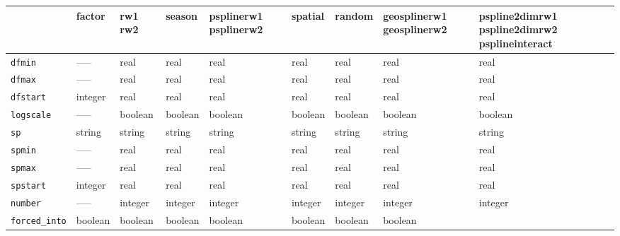 \begin{sidewaystable} \footnotesize
\begin{tabular}{|l||p{1.5cm}|p{1.5cm}|p{1.5cm}|p{1.5cm}|p{2cm}|p{1.5cm}|p{2cm}|p{2.5cm}|}

\hline
                     & factor & rw1 \newline rw2 & season & psplinerw1 \newline psplinerw2 & spatial & random & geosplinerw1 \newline geosplinerw2
                     & pspline2dimrw1 \newline pspline2dimrw2 \newline psplineinteract \\
\hline\hline
 {\tt dfmin}        & -----   & real             & real   & real                           & real    & real   & real
                    & real \\
\hline
 {\tt dfmax}        & -----   & real             & real   & real                           & real    & real   & real
                    & real \\
\hline
 {\tt dfstart}      & integer & real             & real   & real                           & real    & real   & real
                    & real \\
\hline
 {\tt logscale}     & -----   & boolean          & boolean & boolean                       & boolean & boolean & boolean
                    & boolean \\
\hline
 {\tt sp}           & string & string          & string & string                       & string & string  & string
                    & string \\
\hline
 {\tt spmin}        & -----   & real             & real   & real                           & real    & real   & real
                    & real \\
\hline
 {\tt spmax}        & -----   & real             & real   & real                           & real    & real   & real
                    & real \\
\hline
 {\tt spstart}      & integer & real             & real   & real                           & real    & real   & real
                    & real \\
\hline
 {\tt number}       & -----   & integer          & integer & integer                       & integer & integer & integer
                    & integer \\
\hline
 {\tt forced\_into} & boolean & boolean          & boolean & boolean                       & boolean & boolean & boolean

\end{tabular}
\end{sidewaystable}
